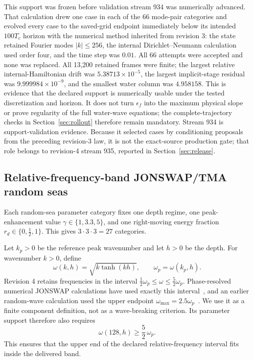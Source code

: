 \documentclass[10pt]{article}
\begin{document}
This support was frozen before validation stream 934 was numerically
advanced.  That calculation drew one case in each of the 66 mode-pair
categories and evolved every case to the saved-grid endpoint immediately
below its intended $100T_c$ horizon with the numerical method inherited
from revision 3: the state retained Fourier modes $|k|\leq256$, the
internal Dirichlet--Neumann calculation used order four, and the time step
was $0.01$.  All 66 attempts
were accepted and none was replaced.  All 13,200 retained frames were finite;
the largest relative internal-Hamiltonian drift was
$5.38713\times10^{-5}$, the largest implicit-stage residual was
$9.999984\times10^{-9}$, and the smallest water column was $4.958158$.
This is evidence that the declared support is numerically usable under the
tested discretization and horizon.  It does not turn $\epsilon_f$ into the
maximum physical slope or prove regularity of the full water-wave equations;
the complete-trajectory checks in Section~\ref{sec:rollout} therefore remain
mandatory.  Stream 934 is support-validation evidence.  Because it selected
cases by conditioning proposals from the preceding revision-3 law, it is not
the exact-source production gate; that role belongs to revision-4 stream 935,
reported in Section~\ref{sec:release}.

\subsection{Relative-frequency-band JONSWAP/TMA random seas}

Each random-sea parameter category fixes one depth regime, one peak-enhancement value
$\gamma\in\{1,3.3,5\}$, and one right-moving energy fraction
$r_d\in\{0,\tfrac12,1\}$.  This gives $3\cdot3\cdot3=27$ categories.

Let $k_p>0$ be the reference peak wavenumber and let $h>0$ be the depth.
For wavenumber $k>0$, define
\[
  \omega(k,h)=\sqrt{k\tanh(kh)},
  \qquad \omega_p=\omega(k_p,h).
\]
Revision 4 retains frequencies in the interval
$\tfrac12\omega_p\leq\omega\leq\tfrac52\omega_p$.  Phase-resolved numerical
JONSWAP calculations have used exactly this interval~\cite{draycott2026},
and an earlier random-wave calculation used the upper endpoint
$\omega_{\max}=2.5\omega_p$~\cite{grice2015}.  We use it as a finite
component definition, not as a wave-breaking criterion.  Its parameter support
therefore also requires
\begin{equation}
  \omega(128,h)\geq\frac52\,\omega_p.
  \label{eq:jonswap-frequency-fit}
\end{equation}
This ensures that the upper end of the declared relative-frequency interval
fits inside the delivered band.
\end{document}
